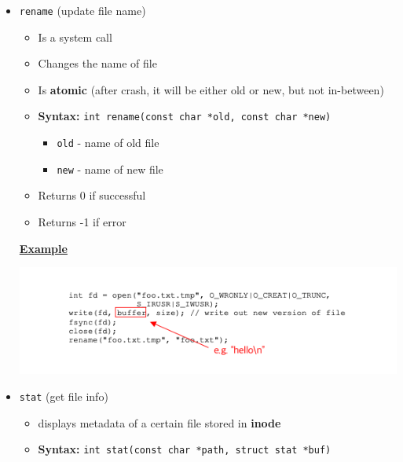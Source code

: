 \documentclass[12pt]{article}
\begin{document}
\begin{enumerate}[1.]
\begin{enumerate}
\begin{itemize}
\begin{itemize}
                \item \texttt{rename} (update file name)

                \begin{itemize}
                    \item Is a system call
                    \item Changes the name of file
                    \item Is \textbf{atomic} (after crash, it will be either old or new, but not in-between)
                    \item \textbf{Syntax:} \texttt{int rename(const char *old, const char *new)}

                    \begin{itemize}
                        \item \texttt{old} - name of old file
                        \item \texttt{new} - name of new file
                    \end{itemize}

                    \item Returns 0 if successful
                    \item Returns -1 if error
                \end{itemize}

                \bigskip

                \underline{\textbf{Example}}

                \begin{center}
                \includegraphics[width=\linewidth]{../images/midterm_4_solution_8.png}
                \end{center}

                \item \texttt{stat} (get file info)

                \begin{itemize}
                    \item displays metadata of a certain file stored in \textbf{inode}
                    \item \textbf{Syntax:} \texttt{int stat(const char *path, struct stat *buf)}


\end{itemize}
\end{itemize}
\end{itemize}
\end{enumerate}
\end{enumerate}
\end{document}
